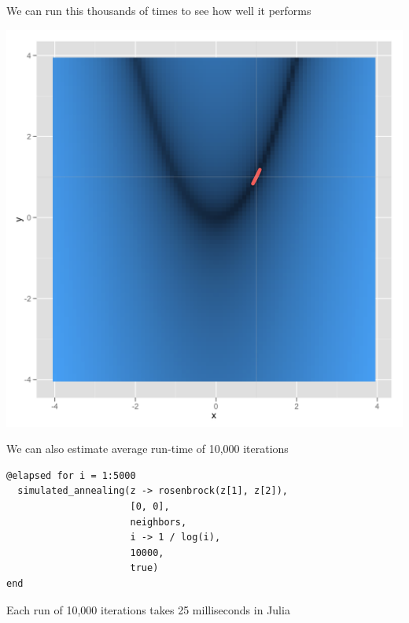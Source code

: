 \documentclass{beamer}
\begin{document}
\frame
{
	\begin{center}
		We can run this thousands of times to see how well it performs
	\end{center}
}

\frame
{
	\begin{center}
		\includegraphics[scale = 0.1]{rosenbrock.png}
	\end{center}
}

\frame
{
	\begin{center}
		We can also estimate average run-time of 10,000 iterations
	\end{center}
}

\begin{frame}[fragile]
	\begin{verbatim}
@elapsed for i = 1:5000
  simulated_annealing(z -> rosenbrock(z[1], z[2]),
                      [0, 0],
                      neighbors,
                      i -> 1 / log(i),
                      10000,
                      true)
end
	\end{verbatim}
\end{frame}

\frame
{
	\begin{center}
		Each run of 10,000 iterations takes 25 milliseconds in Julia
	\end{center}
}
\end{document}
